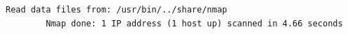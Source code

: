 \documentclass[a4paper, 11pt, answers]{exam}
\begin{document}
\begin{questions}
\begin{parts}
\begin{solution}
\begin{Verbatim}[label={\$ nmap -v prograd.ufabc.edu.br}]
        Read data files from: /usr/bin/../share/nmap
        Nmap done: 1 IP address (1 host up) scanned in 4.66 seconds
      \end{Verbatim}
      \end{solution}
    \end{parts}
  \end{questions}
\end{document}
